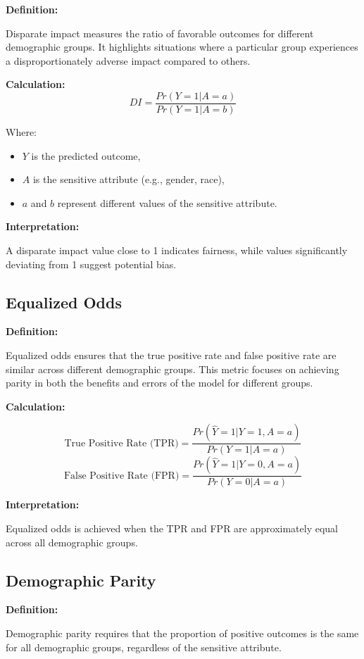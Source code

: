 \documentclass[12pt,a4paper,openright,twoside]{book}
\begin{document}
\textbf{Definition:}

Disparate impact measures the ratio of favorable outcomes for different demographic groups. It highlights situations where a particular group experiences a disproportionately adverse impact compared to others.

\textbf{Calculation:}
\[ DI = \frac{Pr(Y = 1|A=a)}{Pr(Y = 1|A=b)} \]

Where:
\begin{itemize}
    \item \( Y \) is the predicted outcome,
    \item \( A \) is the sensitive attribute (e.g., gender, race),
    \item \( a \) and \( b \) represent different values of the sensitive attribute.
\end{itemize}

\textbf{Interpretation:}

A disparate impact value close to 1 indicates fairness, while values significantly deviating from 1 suggest potential bias.

\subsection{Equalized Odds}

\textbf{Definition:}

Equalized odds ensures that the true positive rate and false positive rate are similar across different demographic groups. This metric focuses on achieving parity in both the benefits and errors of the model for different groups.

\textbf{Calculation:}

\[ \text{True Positive Rate (TPR)} = \frac{Pr(\hat{Y} = 1|Y = 1, A = a)}{Pr(Y = 1|A = a)} \]
\[ \text{False Positive Rate (FPR)} = \frac{Pr(\hat{Y} = 1|Y = 0, A = a)}{Pr(Y = 0|A = a)} \]

\textbf{Interpretation:}

Equalized odds is achieved when the TPR and FPR are approximately equal across all demographic groups.

\subsection{Demographic Parity}

\textbf{Definition:}

Demographic parity requires that the proportion of positive outcomes is the same for all demographic groups, regardless of the sensitive attribute.
\end{document}
